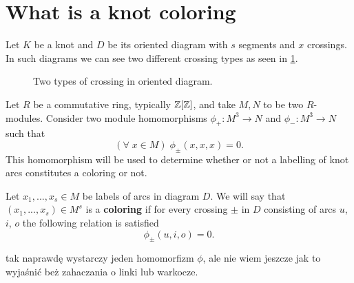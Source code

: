 \section{What is a knot coloring}

Let $K$ be a knot and $D$ be its oriented diagram with $s$ segments and $x$ crossings. In such diagrams we can see two different crossing types as seen in \cref{crossing_type}.
\begin{figure}[h]\centering
  \caption{Two types of crossing in oriented diagram.\label{crossing_type}}
\end{figure}

Let $R$ be a commutative ring, typically $\operatorname{\mathbb{Z}}[\operatorname{\mathbb{Z}}]$, and take $M,N$ to be two $R$-modules. Consider two module homomorphisms $\phi_+:M^3\to N$ and $\phi_-:M^3\to N$ such that
$$(\forall\;x\in M)\;\phi_\pm(x,x,x)=0.$$ 
This homomorphism will be used to determine whether or not a labelling of knot arcs constitutes a coloring or not.

\medskip

\begin{definition}
  Let $x_1,..., x_s\in M$ be labels of arcs in diagram $D$. We will say that $(x_1,...,x_s)\in M^s$ is a \textbf{coloring} if for every crossing $\pm$ in $D$ consisting of arcs $u$, $i$, $o$ the following relation is satisfied
  $$\phi_\pm(u,i,o)=0.$$
\end{definition}

{\large\color{red}tak naprawdę wystarczy jeden homomorfizm $\phi$, ale nie wiem jeszcze jak to wyjaśnić beż zahaczania o linki lub warkocze}.
%
%
%

